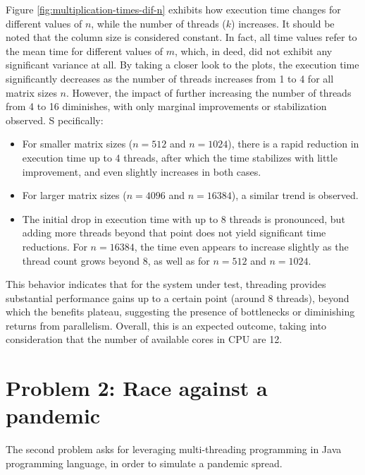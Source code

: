 \documentclass[acmlarge]{acmart}
\begin{document}
Figure \ref{fig:multiplication-times-dif-n} exhibits how execution time changes for different
values of $n$, while the number of threads ($k$) increases.
It should be noted that the column size is considered constant.
In fact, all time values refer to the mean time for different values of $m$, which, in deed, did not exhibit any
significant variance at all.
By taking a closer look to the plots, the execution time significantly decreases as the number of threads increases from 1 to 4 for all matrix sizes \( n \).
However, the impact of further increasing the number of threads from 4 to 16 diminishes, with only marginal improvements or stabilization observed. S
pecifically:

\begin{itemize}
  \item For smaller matrix sizes (\( n = 512 \) and \( n = 1024 \)), there is a rapid reduction in execution time up
  to 4 threads, after which the time stabilizes with little improvement, and even slightly increases in both cases.
  \item For larger matrix sizes (\( n = 4096 \) and \( n = 16384 \)), a similar trend is observed.
  \item The initial drop in execution time with up to 8 threads is pronounced, but adding more threads beyond that
  point does not yield significant time reductions. For \( n = 16384 \), the time even appears to increase slightly
  as the thread count grows beyond 8, as well as for $n=512$ and $n=1024$.
\end{itemize}

This behavior indicates that for the system under test, threading provides substantial performance gains up to a
certain point (around 8 threads), beyond which the benefits plateau, suggesting the presence of bottlenecks or diminishing returns from parallelism.
Overall, this is an expected outcome, taking into consideration that the number of available cores in CPU are 12.


\section{Problem 2: Race against a pandemic}
\label{section:problem2}
The second problem asks for leveraging multi-threading programming in Java programming language, in order to simulate a pandemic spread.
\end{document}
